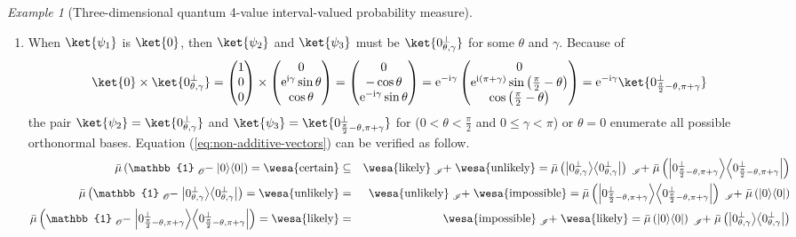 \documentclass{article}
\theoremstyle{remark}
\newtheorem{example}{Example}
\newcommand{\imposs}{{\mbox{\wesa{impossible}}}}
\newcommand{\likely}{{\mbox{\wesa{likely}}}}
\newcommand{\unlikely}{{\mbox{\wesa{unlikely}}}}
\newcommand{\necess}{{\mbox{\wesa{certain}}}}
\newcommand{\rme}{\mathrm{e}}
\newcommand{\rmi}{\mathrm{i}}
\newcommand{\op}[2]{\ensuremath{\left\vert{#1}\middle\rangle\middle\langle{#2}\right\vert}}
\newcommand{\proj}[1]{\op{#1}{#1}}
\begin{document}
\begin{example}[Three-dimensional quantum 4-value interval-valued
probability measure]
\begin{enumerate}
\item When $\ket{\psi_{1}}$ is $\ket{0}$, then $\ket{\psi_{2}}$ and $\ket{\psi_{3}}$
must be $\ket{0_{\theta,\gamma}^{\perp}}$ for some $\theta$ and
$\gamma$. Because of 
\[
\ket{0}\times\ket{0_{\theta,\gamma}^{\perp}}=\begin{pmatrix}1\\
0\\
0
\end{pmatrix}\times\begin{pmatrix}0\\
\rme^{\rmi\gamma}\sin\theta\\
\cos\theta
\end{pmatrix}=\begin{pmatrix}0\\
-\cos\theta\\
\rme^{-\rmi\gamma}\sin\theta
\end{pmatrix}=\rme^{-\rmi\gamma}\begin{pmatrix}0\\
\rme^{\rmi\left(\pi+\gamma\right)}\sin\left(\frac{\pi}{2}-\theta\right)\\
\cos\left(\frac{\pi}{2}-\theta\right)
\end{pmatrix}=\rme^{-\rmi\gamma}\ket{0_{\frac{\pi}{2}-\theta,\pi+\gamma}^{\perp}}
\]
the pair $\ket{\psi_{2}}=\ket{0_{\theta,\gamma}^{\perp}}$ and $\ket{\psi_{3}}=\ket{0_{\frac{\pi}{2}-\theta,\pi+\gamma}^{\perp}}$
for ($0<\theta<\frac{\pi}{2}$ and $0\le\gamma<\pi$) or $\theta=0$
enumerate all possible orthonormal bases. Equation (\ref{eq:non-additive-vectors})
can be verified as follow. 
\begin{eqnarray*}
\bar{\mu}\left(\mathbb{1}\tensor*[_{\mathscr{O}}]{-}{}\proj{0}\right)=\necess & \subseteq & \likely\tensor*[_{\mathscr{I}}]{+}{}\unlikely=\bar{\mu}\left(\proj{0_{\theta,\gamma}^{\perp}}\right)\tensor*[_{\mathscr{I}}]{+}{}\bar{\mu}\left(\proj{0_{\frac{\pi}{2}-\theta,\pi+\gamma}^{\perp}}\right)\\
\bar{\mu}\left(\mathbb{1}\tensor*[_{\mathscr{O}}]{-}{}\proj{0_{\theta,\gamma}^{\perp}}\right)=\unlikely & = & \unlikely\tensor*[_{\mathscr{I}}]{+}{}\imposs=\bar{\mu}\left(\proj{0_{\frac{\pi}{2}-\theta,\pi+\gamma}^{\perp}}\right)\tensor*[_{\mathscr{I}}]{+}{}\bar{\mu}\left(\proj{0}\right)\\
\bar{\mu}\left(\mathbb{1}\tensor*[_{\mathscr{O}}]{-}{}\proj{0_{\frac{\pi}{2}-\theta,\pi+\gamma}^{\perp}}\right)=\likely & = & \imposs\tensor*[_{\mathscr{I}}]{+}{}\likely=\bar{\mu}\left(\proj{0}\right)\tensor*[_{\mathscr{I}}]{+}{}\bar{\mu}\left(\proj{0_{\theta,\gamma}^{\perp}}\right)

\end{eqnarray*}
\end{enumerate}
\end{example}
\end{document}
